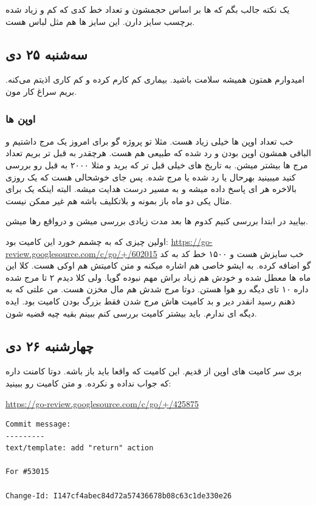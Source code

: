 یک نکته جالب بگم که \cl ها بر اساس حجمشون و تعداد خط کدی که کم و زیاد شده برچسب سایز دارن. این سایز ها هم مثل لباس هست.


\subsection{سه‌شنبه ۲۵ دی}
امیدوارم همتون همیشه سلامت باشید. بیماری کم کارم کرده و کم کاری اذیتم می‌کنه. بریم سراغ کار مون.
\subsubsection{اوپن ها}
خب تعداد اوپن ها خیلی زیاد هست. مثلا تو پروژه گو برای امروز یک مرج داشتیم و الباقی همشون اوپن بودن و رد شده که طبیعی هم هست.
هرچقدر به قبل تر بریم تعداد مرج ها بیشتر میشن. به تاریخ های خیلی قبل تر که برید و مثلا ۲۰۰۰ \cl به قبل
رو بررسی کنید میبینید بهرحال یا رد شده یا مرج شده. پس جای خوشحالی هست که یک روزی بالاخره هر \cl ای پاسخ داده میشه
و به مسیر درست هدایت میشه.
البته اینکه یک \cl برای مثال یکی دو ماه باز بمونه و بلاتکلیف باشه هم غیر ممکن نیست.

بیایید در ابتدا بررسی کنیم کدوم \cl ها بعد مدت زیادی بررسی میشن و درواقع رها میشن.

اولین چیزی که به چشمم خورد این کامیت بود:
\url{https://go-review.googlesource.com/c/go/+/602015}
خب سایزش  هست و ۱۵۰۰ خط کد به کد گو اضافه کرده. به ایشو خاصی هم اشاره میکنه و متن کامیتش هم اوکی هست.
کلا این \cl ماه ها معطل شده و خودش هم زیاد براش مهم نبوده گویا. ولی کلا دیدم ۲ تا مرج شده داره ۱۰ تای دیگه رو هوا هستن.
دوتا مرج شدش هم مال مخزن  هست. من علتی که به ذهنم رسید انقدر دیر و بد کامیت هاش مرج شدن فقط بزرگ بودن کامیت بود.
ایده دیگه ای ندارم. باید بیشتر کامیت بررسی کنم ببینم بقیه چیه قضیه شون.

\subsection{چهارشنبه ۲۶ دی}
بری سر کامیت های اوپن از قدیم. این کامیت که واقعا باید باز باشه. دوتا کامنت داره که جواب نداده و  نکرده.
و متن کامیت رو ببینید:

\begin{latin}
\url{https://go-review.googlesource.com/c/go/+/425875}

\begin{verbatim}
Commit message:
---------
text/template: add "return" action

For #53015

Change-Id: I147cf4abec84d72a57436678b08c63c1de330e26
\end{verbatim}
\end{latin}

